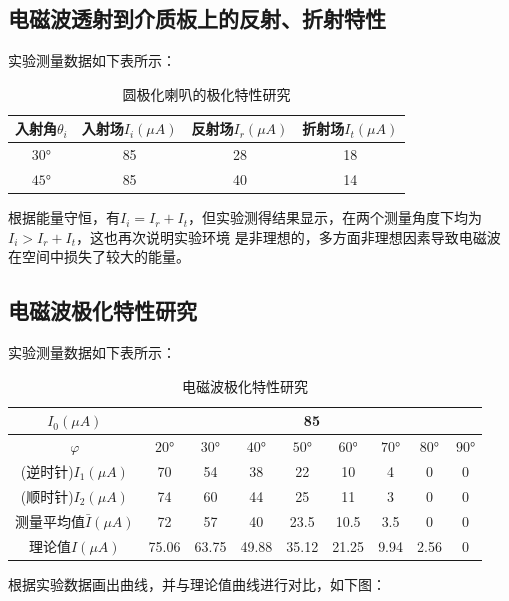 \documentclass[UTF8]{ctexart}
\begin{document}
\subsection{电磁波透射到介质板上的反射、折射特性}
实验测量数据如下表所示：
\begin{table}[H]
    \centering
    \renewcommand{\arraystretch}{1.5}
    \caption{圆极化喇叭的极化特性研究}
    \begin{tabular}{|c|c|c|c|}\hline
        入射角$\theta_i$&入射场$I_i(\mu A)$&反射场$I_r(\mu A)$&折射场$I_t(\mu A)$\\\hline
        $30°$&85&28&18\\\hline
        $45°$&85&40&14\\\hline
    \end{tabular}
\end{table}

根据能量守恒，有$I_i= I_r+I_t$，但实验测得结果显示，在两个测量角度下均为$I_i>I_r+I_t$，这也再次说明实验环境
是非理想的，多方面非理想因素导致电磁波在空间中损失了较大的能量。


\subsection{电磁波极化特性研究}
实验测量数据如下表所示：
\begin{table}[H]
    \centering
    \renewcommand{\arraystretch}{1.5}
    \caption{电磁波极化特性研究}
    \begin{tabular}{|c|c|c|c|c|c|c|c|c|}\hline
        $I_0(\mu A)$&\multicolumn{8}{c|}{85}\\\hline
        $\varphi$&$20°$&$30°$&$40°$&$50°$&$60°$&$70°$&$80°$&$90°$\\\hline
        (逆时针)$I_1(\mu A)$&70&54&38&22&10&4&0&0\\\hline
        (顺时针)$I_2(\mu A)$&74&60&44&25&11&3&0&0\\\hline
        测量平均值$\bar{I}(\mu A)$&72&57&40&23.5&10.5&3.5&0&0\\\hline
        理论值$I(\mu A)$&75.06&63.75&49.88&35.12&21.25&9.94&2.56&0\\\hline
    \end{tabular}
\end{table}


根据实验数据画出曲线，并与理论值曲线进行对比，如下图：
\end{document}
